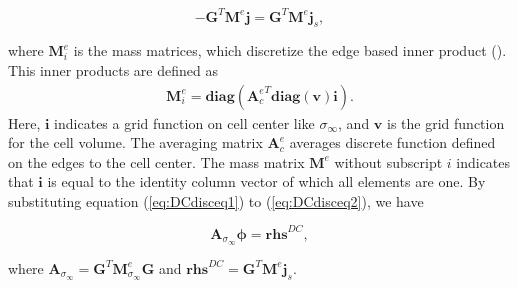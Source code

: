 \documentclass[extra,mreferee]{gji}
\newcommand{\siginf}{\sigma_\infty}
\newcommand{\dgrad}{{\mathbf G}}
\newcommand{\Ace}{{\mathbf A_c^e}}
\newcommand{\diag}{\mathbf{diag}}
\newcommand{\M}{{\mathbf M}}
\newcommand{\MeSigInf}{{\M^e_{\sigma_\infty}}}
\newcommand{\Me}{{\M^e}}
\renewcommand {\dj}  { {\mathbf{j} } }
\newcommand{\vol}{\mathbf{v}}
\newcommand{\A}{\mathbf{A}}
\begin{document}
\begin{linenomath*}
\begin{equation}
  -\dgrad^T \Me\dj = \dgrad^T \Me\dj_s,
  \label{eq:DCdisceq2}
\end{equation}
\end{linenomath*}
where $\mathbf{M}^e_i$ is the mass matrices, which discretize the edge based inner product (\cite[]{Eldadbook}). This inner products are defined  as
\begin{align}
  \mathbf{M}^e_i = \diag(\Ace^T\diag(\vol)\mathbf{i}).
\end{align}
Here, $\mathbf{i}$ indicates a grid function on cell center like $\siginf$, and $\vol$ is the grid function for the cell volume. The averaging matrix $\Ace$ averages discrete function defined on the edges to the cell center. The mass matrix $\Me$ without subscript $i$ indicates that $\mathbf{i}$ is equal to the identity column vector of which all elements are one. By substituting equation (\ref{eq:DCdisceq1}) to (\ref{eq:DCdisceq2}), we have
\begin{linenomath*}
\begin{equation}
  \A_{\siginf}\boldsymbol{\phi} = \mathbf{rhs}^{DC},
  \label{eq:DCdiscLin}
\end{equation}
\end{linenomath*}
where $\A_{\siginf} = \dgrad^T \MeSigInf\dgrad$ and $\mathbf{rhs}^{DC} = \dgrad^T \Me\dj_s$. 

\end{document}
